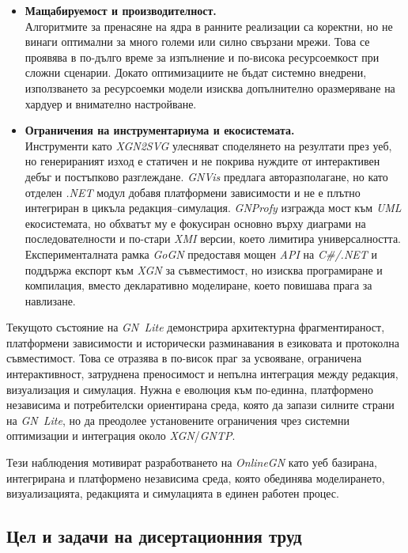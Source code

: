\begin{itemize}
    \item \textbf{Мащабируемост и производителност.} \\
    Алгоритмите за пренасяне на ядра в ранните реализации са коректни, но не винаги оптимални за много големи или силно свързани мрежи. Това се проявява в по-дълго време за изпълнение и по-висока ресурсоемкост при сложни сценарии. Докато оптимизациите не бъдат системно внедрени, използването за ресурсоемки модели изисква допълнително оразмеряване на хардуер и внимателно настройване.

    \item \textbf{Ограничения на инструментариума и екосистемата.}\\ 
    Инструменти като \textit{XGN2SVG} улесняват споделянето на резултати през уеб, но генерираният изход е статичен и не покрива нуждите от интерактивен дебъг и постъпково разглеждане. \textit{GNVis} предлага авторазполагане, но като отделен \textit{.NET} модул добавя платформени зависимости и не е плътно интегриран в цикъла редакция--симулация. \textit{GNProfy} изгражда мост към \textit{UML} екосистемата, но обхватът му е фокусиран основно върху диаграми на последователности и по-стари \textit{XMI} версии, което лимитира универсалността. Експерименталната рамка \textit{GoGN} предоставя мощен \textit{API} на \textit{C\#/.NET} и поддържа експорт към \textit{XGN} за съвместимост, но изисква програмиране и компилация, вместо декларативно моделиране, което повишава прага за навлизане.

\end{itemize}

    Текущото състояние на \textit{GN~Lite} демонстрира архитектурна фрагментираност, платформени зависимости и исторически разминавания в езиковата и протоколна съвместимост. Това се отразява в по-висок праг за усвояване, ограничена интерактивност, затруднена преносимост и непълна интеграция между редакция, визуализация и симулация. Нужна е еволюция към по-единна, платформено независима и потребителски ориентирана среда, която да запази силните страни на \textit{GN~Lite}, но да преодолее установените ограничения чрез системни оптимизации и интеграция около \textit{XGN}/\textit{GNTP}.
	
	Тези наблюдения мотивират разработването на \textit{OnlineGN} като уеб базирана, интегрирана и платформено независима среда, която обединява моделирането, визуализацията, редакцията и симулацията в единен работен процес.

\subsection{Цел и задачи на дисертационния труд}

